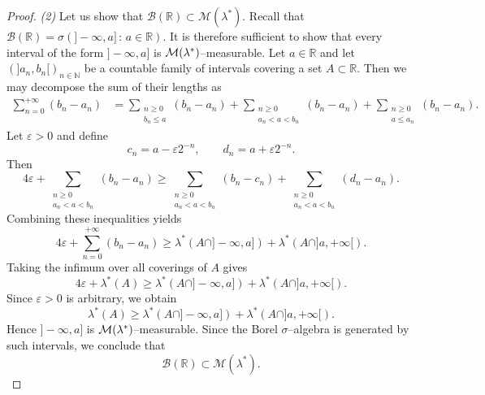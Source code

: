\begin{proof}
		\emph{(2)} Let us show that $\mathcal{B}(\mathbb{R}) \subset \mathcal{M}(\lambda^*)$. Recall that $\mathcal{B}(\mathbb{R})=\sigma(]-\infty,a]\,:\,a\in\mathbb{R})$.
		It is therefore sufficient to show that every interval of the form
	$]-\infty,a]$ is $\mathcal{M}(\lambda^*)$–measurable.
		Let $a\in\mathbb{R}$ and let $(]a_n,b_n[)_{n\in\mathbb{N}}$ be a countable
		family of intervals covering a set $A\subset\mathbb{R}$.
		Then we may decompose the sum of their lengths as
		\begin{align}
			\sum_{n=0}^{+\infty}(b_n-a_n)
			 & =
			\sum_{\substack{n\ge0 \\ b_n\le a}}(b_n-a_n)
			+
			\sum_{\substack{n\ge0 \\ a_n<a<b_n}}(b_n-a_n)
			+
			\sum_{\substack{n\ge0 \\ a\le a_n}}(b_n-a_n).
		\end{align}
		Let $\varepsilon>0$ and define
		\[
			c_n=a-\varepsilon2^{-n}, \qquad d_n=a+\varepsilon2^{-n}.
		\]
		Then
		\[
			4\varepsilon
			+
			\sum_{\substack{n\ge0 \\ a_n<a<b_n}}(b_n-a_n)
			\ge
			\sum_{\substack{n\ge0 \\ a_n<a<b_n}}(b_n-c_n)
			+
			\sum_{\substack{n\ge0 \\ a_n<a<b_n}}(d_n-a_n).
		\]
		Combining these inequalities yields
		\[
			4\varepsilon
			+
			\sum_{n=0}^{+\infty}(b_n-a_n)
			\ge
			\lambda^*(A\cap]-\infty,a])
			+
			\lambda^*(A\cap]a,+\infty[).
		\]
		Taking the infimum over all coverings of $A$ gives
		\[
			4\varepsilon+\lambda^*(A)
			\ge
			\lambda^*(A\cap]-\infty,a])
			+
			\lambda^*(A\cap]a,+\infty[).
		\]
		Since $\varepsilon>0$ is arbitrary, we obtain
		\[
			\lambda^*(A)
			\ge
			\lambda^*(A\cap]-\infty,a])
			+
			\lambda^*(A\cap]a,+\infty[).
		\]
		Hence $]-\infty,a]$ is $\mathcal{M}(\lambda^*)$–measurable. Since the Borel
	$\sigma$–algebra is generated by such intervals, we conclude that
		\[
			\mathcal{B}(\mathbb{R})\subset\mathcal{M}(\lambda^*).
		\]

		\medskip


\end{proof}

